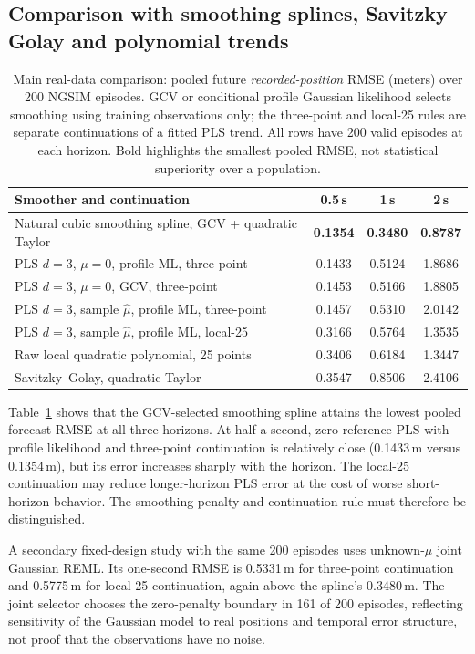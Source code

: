 \subsection{Comparison with smoothing splines,
Savitzky--Golay and polynomial trends}
\begin{table}[t]
\centering
\caption{Main real-data comparison: pooled future
\emph{recorded-position} RMSE (meters) over
200 NGSIM episodes. GCV or conditional
profile Gaussian likelihood selects
smoothing using training observations
only; the three-point and local-25 rules
are separate continuations of a fitted
PLS trend. All rows have 200 valid episodes
at each horizon. Bold highlights the
smallest pooled RMSE, not statistical
superiority over a population.}
\label{tab:ngsim-main}
\begin{tabular}{lccc}
\toprule
Smoother and continuation & 0.5\,s & 1\,s & 2\,s\\
\midrule
Natural cubic smoothing spline, GCV + quadratic Taylor
 & \textbf{0.1354} & \textbf{0.3480} & \textbf{0.8787}\\
PLS $d=3$, $\mu=0$, profile ML, three-point
 & 0.1433 & 0.5124 & 1.8686\\
PLS $d=3$, $\mu=0$, GCV, three-point
 & 0.1453 & 0.5166 & 1.8805\\
PLS $d=3$, sample $\widehat\mu$, profile ML, three-point
 & 0.1457 & 0.5310 & 2.0142\\
PLS $d=3$, sample $\widehat\mu$, profile ML, local-25
 & 0.3166 & 0.5764 & 1.3535\\
Raw local quadratic polynomial, 25 points
 & 0.3406 & 0.6184 & 1.3447\\
Savitzky--Golay, quadratic Taylor
 & 0.3547 & 0.8506 & 2.4106\\
\bottomrule
\end{tabular}
\end{table}

Table~\ref{tab:ngsim-main} shows that
the GCV-selected smoothing spline attains
the lowest pooled forecast RMSE at all three
horizons. At half a second, zero-reference
PLS with profile likelihood and three-point
continuation is relatively close
(0.1433\,m versus 0.1354\,m), but its
error increases sharply with the horizon.
The local-25 continuation may reduce
longer-horizon PLS error at the cost
of worse short-horizon behavior.
The smoothing penalty and continuation
rule must therefore be distinguished.

A secondary fixed-design study with the same
200 episodes uses unknown-$\mu$ joint Gaussian
REML. Its one-second RMSE is 0.5331\,m
for three-point continuation and 0.5775\,m
for local-25 continuation, again above
the spline's 0.3480\,m. The joint selector
chooses the zero-penalty boundary in 161
of 200 episodes, reflecting sensitivity
of the Gaussian model to real positions
and temporal error structure, not proof
that the observations have no noise.

